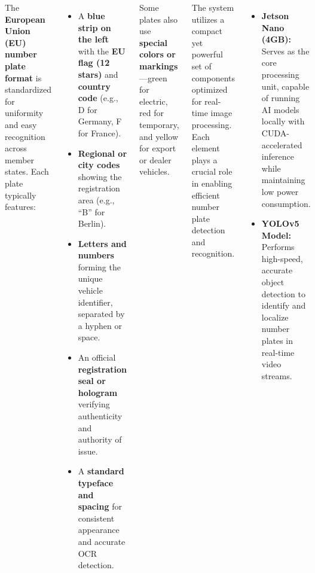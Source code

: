 \documentclass[25pt,a0paper, portrait]{tikzposter}
\begin{document}
\begin{columns}
{			
			{
				The \textbf{European Union (EU) number plate format} is standardized for uniformity and easy recognition across member states. Each plate typically features:
				
				\begin{itemize}
					\item A \textbf{blue strip on the left} with the \textbf{EU flag (12 stars)} and \textbf{country code} (e.g., D for Germany, F for France).
					
					\item \textbf{Regional or city codes} showing the registration area (e.g., “B” for Berlin).
					
					\item \textbf{Letters and numbers} forming the unique vehicle identifier, separated by a hyphen or space.
					
					\item An official \textbf{registration seal or hologram} verifying authenticity and authority of issue.
					
					\item A \textbf{standard typeface and spacing} for consistent appearance and accurate OCR detection.
				\end{itemize}
				
				Some plates also use \textbf{special colors or markings}—green for electric, red for temporary, and yellow for export or dealer vehicles.
			}
			
			
			
		
		}
		
		
		{
			{
				The system utilizes a compact yet powerful set of components optimized for real-time image processing. Each element plays a crucial role in enabling efficient number plate detection and recognition.
				
				\begin{itemize}
					\item \textbf{Jetson Nano (4GB):} Serves as the core processing unit, capable of running AI models locally with CUDA-accelerated inference while maintaining low power consumption.
				
					
					\item \textbf{YOLOv5 Model:} Performs high-speed, accurate object detection to identify and localize number plates in real-time video streams.
					

\end{itemize}}}
\end{columns}
\end{document}
